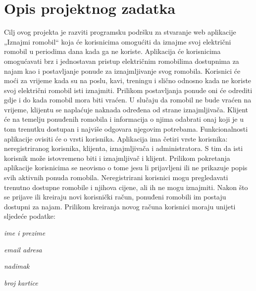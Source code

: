 \chapter{Opis projektnog zadatka}
		
		Cilj ovog projekta je razviti programsku podršku za stvaranje web aplikacije „Iznajmi romobil“ koja će korisnicima omogućiti da iznajme svoj električni romobil u periodima dana kada ga ne koriste. Aplikacija će korisnicima omogućavati brz i jednostavan pristup električnim romobilima dostupnima za najam kao i postavljanje ponude za iznajmljivanje svog romobila. Korisnici će moći za vrijeme kada su na poslu, kavi, treningu i slično odnosno kada ne koriste svoj električni romobil isti iznajmiti. Prilikom postavljanja ponude oni će odrediti gdje i do kada romobil mora biti vraćen. U slučaju da romobil ne bude vraćen na vrijeme, klijentu se naplaćuje naknada određena od strane iznajmljivača. Klijent će na temelju ponuđenih romobila i informacija o njima odabrati onaj koji je u tom trenutku dostupan i najviše odgovara njegovim potrebama. Funkcionalnosti aplikacije ovisiti će o vrsti korisnika. Aplikacija ima četiri vrste korisnika: neregistriranog korisnika, klijenta, iznajmljivača i administratora. S tim da isti korisnik može istovremeno biti i iznajmljivač i klijent.
		\newline 
		\newline
		Prilikom pokretanja aplikacije korisnicima se neovisno o tome jesu li prijavljeni ili ne prikazuje popis svih aktivnih ponuda romobila. Neregistrirani korisnici mogu pregledavati trenutno dostupne romobile i njihova cijene, ali ih ne mogu iznajmiti. Nakon što se prijave ili kreiraju novi korisnički račun, ponuđeni romobili im postaju dostupni za najam. Prilikom kreiranja novog računa korisnici moraju unijeti sljedeće podatke:
		
		\begin{packed_item}
			\item \textit{ime i prezime}
			\item \textit{email adresa}
			\item \textit{nadimak}
			\item \textit{broj kartice}
		\end{packed_item}
		
